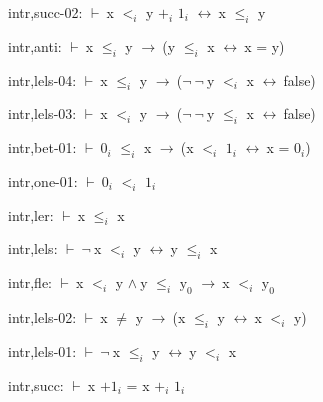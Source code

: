 \documentclass[a4paper]{article}
\newcommand{\Fol}{\mbox{$\vdash\ $}}
\newcommand{\Not}{\mbox{$\neg\ $}}
\newcommand{\And}{\mbox{$\wedge\ $}}
\newcommand{\Imp}{\mbox{$\rightarrow\ $}}
\newcommand{\Equiv}{\mbox{$\leftrightarrow\ $}}
\begin{document}
intr,succ-02: 
 \Fol x $\mbox{$<$}_{i}$ y $\mbox{+}_{i}$ $\mbox{1}_{i}$ \Equiv x $\mbox{$\le$}_{i}$ y



intr,anti: 
 \Fol x $\mbox{$\le$}_{i}$ y \Imp (y $\mbox{$\le$}_{i}$ x \Equiv x = y)



intr,lels-04: 
 \Fol x $\mbox{$\le$}_{i}$ y \Imp (\Not \Not y $\mbox{$<$}_{i}$ x \Equiv false)



intr,lels-03: 
 \Fol x $\mbox{$<$}_{i}$ y \Imp (\Not \Not y $\mbox{$\le$}_{i}$ x \Equiv false)



intr,bet-01: 
 \Fol $\mbox{0}_{i}$ $\mbox{$\le$}_{i}$ x \Imp (x $\mbox{$<$}_{i}$ $\mbox{1}_{i}$ \Equiv x = $\mbox{0}_{i}$)



intr,one-01: 
 \Fol $\mbox{0}_{i}$ $\mbox{$<$}_{i}$ $\mbox{1}_{i}$



intr,ler: 
 \Fol x $\mbox{$\le$}_{i}$ x



intr,lels: 
 \Fol \Not x $\mbox{$<$}_{i}$ y \Equiv y $\mbox{$\le$}_{i}$ x



intr,fle: 
 \Fol x $\mbox{$<$}_{i}$ y \And y $\mbox{$\le$}_{i}$ $\mbox{y}_{0}$ \Imp x $\mbox{$<$}_{i}$ $\mbox{y}_{0}$



intr,lels-02: 
 \Fol x $\neq$ y \Imp (x $\mbox{$\le$}_{i}$ y \Equiv x $\mbox{$<$}_{i}$ y)



intr,lels-01: 
 \Fol \Not x $\mbox{$\le$}_{i}$ y \Equiv y $\mbox{$<$}_{i}$ x



intr,succ: 
 \Fol x $\mbox{+1}_{i}$ = x $\mbox{+}_{i}$ $\mbox{1}_{i}$
\end{document}
